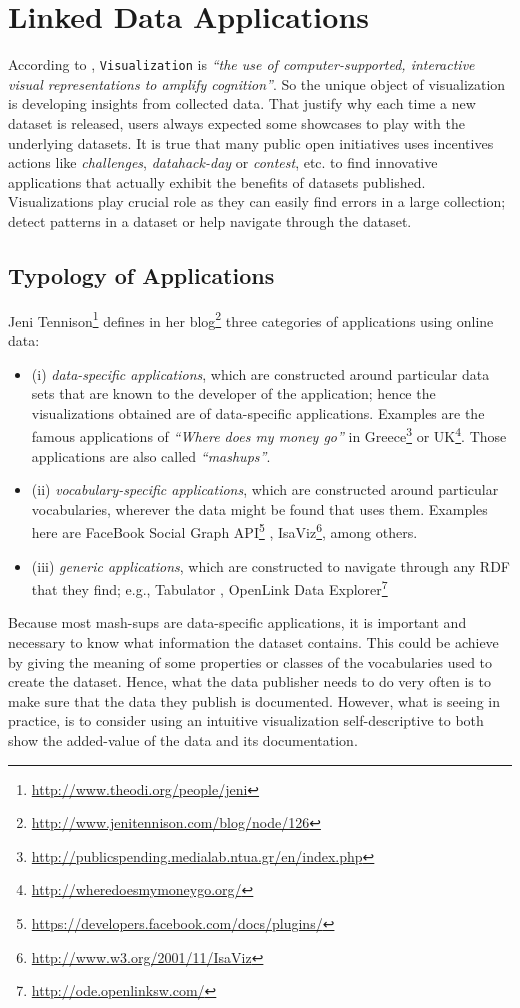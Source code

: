 \section{Linked Data Applications} 
\label{sec:apps}
According to \cite{card99}, \texttt{Visualization} is \textit{ ``the use of computer-supported, interactive visual representations to amplify cognition''}. So the unique object of visualization is developing insights from collected data. That justify why each time a new dataset is released, users always expected some showcases to play with the underlying datasets. It is true that many public open initiatives uses incentives actions like \textit{challenges}, \textit{datahack-day} or \textit{contest}, etc. to find innovative applications that actually exhibit the benefits of datasets published. Visualizations play crucial role as they can easily find errors in a large collection; detect patterns in a dataset or help navigate through the dataset. 

\subsection{Typology of Applications}
Jeni Tennison\footnote{\url{http://www.theodi.org/people/jeni}} defines  in her blog\footnote{\url{http://www.jenitennison.com/blog/node/126}} three categories of applications using online data:
\begin{itemize}
\item (i) \textit{data-specific applications}, which are constructed around particular data sets that are known to the developer of the application; hence the visualizations obtained are of data-specific applications. Examples are the famous applications of \textit{``Where does my money go''}  in Greece\footnote{\url{http://publicspending.medialab.ntua.gr/en/index.php}} or UK\footnote{\url{http://wheredoesmymoneygo.org/}}. Those applications are also called \textit{``mashups''}. 
\item (ii) \textit{vocabulary-specific applications}, which are constructed around particular vocabularies, wherever the data might be found that uses them. Examples here are FaceBook Social Graph API\footnote{\url{https://developers.facebook.com/docs/plugins/}} , IsaViz\footnote{\url{http://www.w3.org/2001/11/IsaViz}}, among others.
\item (iii) \textit{generic applications}, which are constructed to navigate through any RDF that they find; e.g., Tabulator \cite{tabulator06}, OpenLink Data Explorer\footnote{\url{http://ode.openlinksw.com/}}

\end{itemize}
Because most mash-sups are data-specific applications, it is important and necessary to  know what information the dataset contains. This could be achieve by giving the meaning of some properties or classes of the vocabularies used to create the dataset. Hence, what the data publisher needs to do very often is to make sure that the data they publish is documented. However, what is seeing in practice, is to consider using an intuitive visualization self-descriptive to both show the added-value of the data and its documentation.


